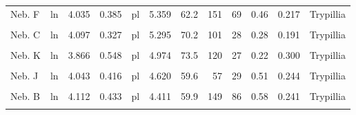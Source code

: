 \documentclass[
  12pt,
]{book}
\begin{document}
\begin{landscape}
\begin{table}
\begin{tabular}[t]{llrrlrrrrrrl}
Neb. F & ln & 4.035 & 0.385 & pl & 5.359 & 62.2 & 151 & 69 & 0.46 & 0.217 & Trypillia\\
\cellcolor{gray!6}{Vráble N} & \cellcolor{gray!6}{ln} & \cellcolor{gray!6}{4.215} & \cellcolor{gray!6}{0.358} & \cellcolor{gray!6}{pl} & \cellcolor{gray!6}{5.350} & \cellcolor{gray!6}{80.6} & \cellcolor{gray!6}{124} & \cellcolor{gray!6}{41} & \cellcolor{gray!6}{0.33} & \cellcolor{gray!6}{0.208} & \cellcolor{gray!6}{Linear Pottery}\\
Neb. C & ln & 4.097 & 0.327 & pl & 5.295 & 70.2 & 101 & 28 & 0.28 & 0.191 & Trypillia\\
\addlinespace
\cellcolor{gray!6}{Neb. L} & \cellcolor{gray!6}{ln} & \cellcolor{gray!6}{4.040} & \cellcolor{gray!6}{0.501} & \cellcolor{gray!6}{pl} & \cellcolor{gray!6}{5.285} & \cellcolor{gray!6}{68.6} & \cellcolor{gray!6}{126} & \cellcolor{gray!6}{54} & \cellcolor{gray!6}{0.43} & \cellcolor{gray!6}{0.255} & \cellcolor{gray!6}{Trypillia}\\
Neb. K & ln & 3.866 & 0.548 & pl & 4.974 & 73.5 & 120 & 27 & 0.22 & 0.300 & Trypillia\\
\cellcolor{gray!6}{Neb. I} & \cellcolor{gray!6}{ln} & \cellcolor{gray!6}{4.113} & \cellcolor{gray!6}{0.393} & \cellcolor{gray!6}{pl} & \cellcolor{gray!6}{4.832} & \cellcolor{gray!6}{63.0} & \cellcolor{gray!6}{104} & \cellcolor{gray!6}{49} & \cellcolor{gray!6}{0.47} & \cellcolor{gray!6}{0.218} & \cellcolor{gray!6}{Trypillia}\\
Neb. J & ln & 4.043 & 0.416 & pl & 4.620 & 59.6 & 57 & 29 & 0.51 & 0.244 & Trypillia\\
\cellcolor{gray!6}{Neb. H} & \cellcolor{gray!6}{ln} & \cellcolor{gray!6}{4.175} & \cellcolor{gray!6}{0.390} & \cellcolor{gray!6}{pl} & \cellcolor{gray!6}{4.451} & \cellcolor{gray!6}{60.8} & \cellcolor{gray!6}{106} & \cellcolor{gray!6}{63} & \cellcolor{gray!6}{0.59} & \cellcolor{gray!6}{0.221} & \cellcolor{gray!6}{Trypillia}\\
\addlinespace
Neb. B & ln & 4.112 & 0.433 & pl & 4.411 & 59.9 & 149 & 86 & 0.58 & 0.241 & Trypillia\\
\cellcolor{gray!6}{Neb. M} & \cellcolor{gray!6}{ln} & \cellcolor{gray!6}{3.985} & \cellcolor{gray!6}{0.466} & \cellcolor{gray!6}{pl} & \cellcolor{gray!6}{3.614} & \cellcolor{gray!6}{50.3} & \cellcolor{gray!6}{60} & \cellcolor{gray!6}{34} & \cellcolor{gray!6}{0.57} & \cellcolor{gray!6}{0.271} & \cellcolor{gray!6}{Trypillia}\\
\bottomrule
\end{tabular}
\end{table}
\end{landscape}
\end{document}
